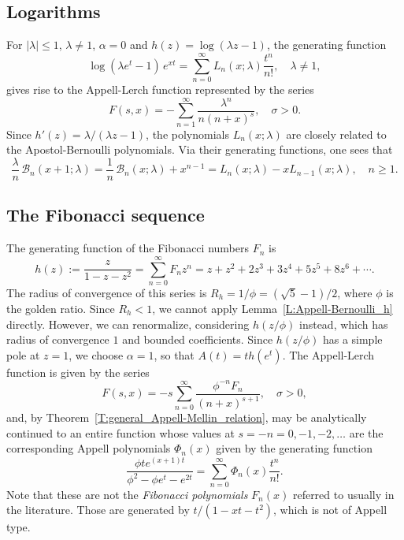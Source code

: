 \documentclass[11pt,a4paper]{amsart}
\newcommand{\AB}{\mathcal{B}}
\theoremstyle{plain}
\theoremstyle{plain}
\theoremstyle{definition}
\theoremstyle{remark}
\begin{document}
\subsection{Logarithms}


For $|\lambda|\leq 1$, $\lambda \neq 1$, $\alpha = 0$ and $h(z)=\log(\lambda z-1)$,
the generating function
% 
\begin{equation*}
  \log(\lambda e^t-1)\,e^{xt} = \sum_{n=0}^\infty L_{n}(x;\lambda)\frac{t^n}{n!},\quad \lambda \neq 1,
\end{equation*}
% 
gives rise to the Appell-Lerch function represented by the series
\[
	F(s,x) = -\sum_{n=1}^\infty\frac{\lambda^n}{n(n + x)^{s}},\quad \sigma>0.
\]
Since $h'(z) = \lambda/(\lambda z - 1)$, 
the polynomials $L_{n}(x;\lambda)$ are closely related to the Apostol-Bernoulli polynomials. Via their generating functions, one sees that
\[
	  \frac{\lambda}{n}\, \AB_{n}(x+1;\lambda)
	= \frac{1}{n}\, \AB_{n}(x;\lambda) + x^{n-1}
	= L_{n}(x;\lambda) - x L_{n-1}(x;\lambda),
	\quad
	n \geq 1.	
\]


\subsection{The Fibonacci sequence}
\label{subsec:Fibonacci}


The generating function of the Fibonacci numbers $F_{n}$ is
\[
	h(z) := \frac{z}{1-z-z^2} 
	      = \sum_{n=0}^{\infty} F_{n} z^{n}
	      = z + z^{2} + 2 z^{3} + 3 z^{4} + 5 z^{5} + 8 z^{6} + \cdots.
\]
The radius of convergence of this series is $R_{h} = 1/\phi = (\sqrt{5}-1)/2$, where $\phi$ is the golden ratio. Since $R_{h} < 1$, we cannot apply Lemma~\ref{L:Appell-Bernoulli_h} directly. However, we can renormalize, considering $h(z/\phi)$ instead, which has radius of convergence $1$ and bounded coefficients. Since $h(z/\phi)$ has a simple pole at $z=1$, we choose $\alpha = 1$, so that $A(t) = t h(e^{t})$. The Appell-Lerch function is given by the series
\[
	F(s,x) = -s \sum_{n=0}^{\infty} \frac{\phi^{-n} F_{n}}{(n+x)^{s+1}},
	\quad
	\sigma > 0,
\]
and, by Theorem~\ref{T:general_Appell-Mellin_relation}, may be analytically continued to an entire function whose values at $s=-n=0,-1,-2,\dots$ are the corresponding Appell polynomials $\Phi_{n}(x)$ given by the generating function
\[
	\frac{\phi t e^{(x + 1)t}}{\phi^{2} - \phi e^{t} - e^{2t}} 
	= \sum_{n=0}^{\infty} \Phi_{n}(x) \frac{t^{n}}{n!}.
\]
Note that these are not the \emph{Fibonacci polynomials} $F_{n}(x)$ referred to usually in the literature. Those are generated by $t/(1-xt-t^2)$, which is not of Appell type.
\end{document}
